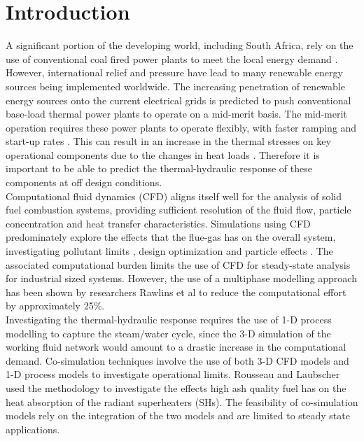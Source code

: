 \documentclass[a4paper,fleqn]{cas-sc}
\begin{document}
\maketitle

\section{Introduction}\label{intro}
A significant portion of the developing world, including South Africa, rely on the use of conventional coal fired power plants to meet the local energy demand \cite{Rousseau2020}. However, international relief and pressure have lead to many renewable energy sources being implemented worldwide. The increasing penetration of renewable energy sources onto the current electrical grids is predicted to push conventional base-load thermal power plants to operate on a mid-merit basis. The mid-merit operation requires these power plants to operate flexibly, with faster ramping and start-up rates \cite{Safdarnejad2019}. This can result in an increase in the thermal stresses on key operational components due to the changes in heat loads \cite{Modlinski2019}. Therefore it is important to be able to predict the thermal-hydraulic response of these components at off design conditions.\\

Computational fluid dynamics (CFD) aligns itself well for the analysis of solid fuel combustion systems, providing sufficient resolution of the fluid flow, particle concentration and heat transfer characteristics. Simulations using CFD predominately explore the effects that the flue-gas has on the overall system, investigating pollutant limits \cite{Liu2021}, design optimization \cite{dugum2019, Gu2020} and particle effects \cite{Laubscher2020}. The associated computational burden limits the use of CFD for steady-state analysis for industrial sized systems. However, the use of a multiphase modelling approach has been shown by researchers Rawlins et al \cite{Rawlins2022} to reduce the computational effort by approximately 25\%.\\

Investigating the thermal-hydraulic response requires the use of 1-D process modelling to capture the steam/water cycle, since the 3-D simulation of the working fluid network would amount to a drastic increase in the computational demand. Co-simulation techniques involve the use of both 3-D CFD models and 1-D process models to investigate operational limits. Rousseau and Laubscher \cite{Rousseau2020} used the methodology to investigate the effects high ash quality fuel has on the heat absorption of the radiant superheaters (SHs). The feasibility of co-simulation models rely on the integration of the two models and are limited to steady state applications.\\
\end{document}

